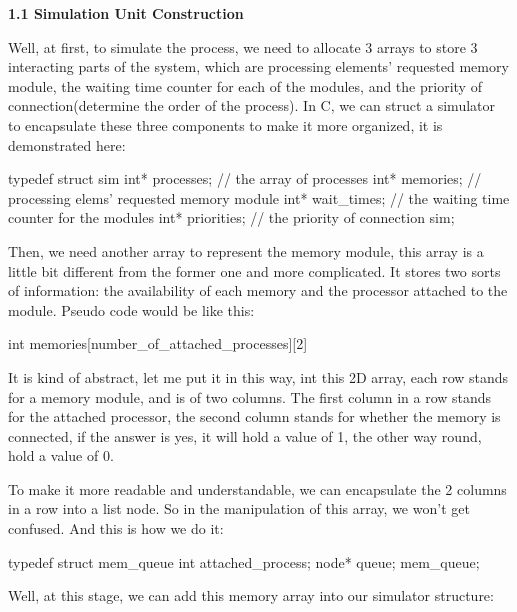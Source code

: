 \documentclass{article}%
\newenvironment{code}%
   {\snugshade\verbatim}%
   {\endverbatim\endsnugshade}
\begin{document}
\begin{Large}
\begin{LARGE}
\textbf{1.1 Simulation Unit Construction}
\end{LARGE}


Well, at first, to simulate the process, we need to allocate 3 arrays to store 3 interacting parts of the system, which are processing elements' requested memory module, the waiting time counter for each of the modules, and the priority of connection(determine the order of the process). In C, we can struct a simulator to encapsulate these three components to make it more organized, it is demonstrated here:

\begin{code}
    typedef struct sim {
        int* processes; // the array of processes
        int* memories; // processing elems' requested memory module
        int* wait_times; // the waiting time counter for the modules
        int* priorities; // the priority of connection
    } sim;
\end{code}

Then, we need another array to represent the memory module, this array is a little bit different from the former one and more complicated. It stores two sorts of information: the availability of each memory and the processor attached to the module. Pseudo code would be like this:

\begin{code}
    int memories[number_of_attached_processes][2]
\end{code}

It is kind of abstract, let me put it in this way, int this 2D array, each row stands for a memory module, and is of two columns. The first column in a row stands for the attached processor, the second column stands for whether the memory is connected, if the answer is yes, it will hold a value of 1, the other way round, hold a value of 0.

To make it more readable and understandable, we can encapsulate the 2 columns in a row into a list node. So in the manipulation of this array, we won't get confused. And this is how we do it:
\newpage

\begin{code}
    typedef struct mem_queue {
        int attached_process;
        node* queue;
    } mem_queue;
\end{code}

Well, at this stage, we can add this memory array into our simulator structure:


\end{Large}
\end{document}
